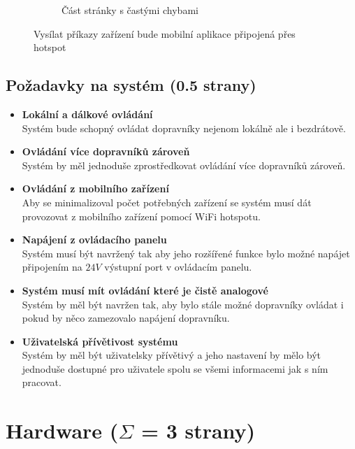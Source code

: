 \begin{figure}[H]
\begin{subfigure}[t]{0.3\textwidth}
        \caption{Část stránky s častými chybami}
        \label{fig:MobilniHelp}
    \end{subfigure}
    \caption{Vysílat příkazy zařízení bude mobilní aplikace připojená přes hotspot}
    \label{fig:MobilniAppScreenshots}
\end{figure}

\subsection{Požadavky na systém (0.5 strany)}\label{sec:PozadavkyNaSystem}
\begin{itemize}
    \item \textbf{Lokální a dálkové ovládání}\\
    Systém bude schopný ovládat dopravníky nejenom lokálně ale i bezdrátově.
    \item \textbf{Ovládání více dopravníků zároveň}\\
    Systém by měl jednoduše zprostředkovat ovládání více dopravníků zároveň.
    \item \textbf{Ovládání z mobilního zařízení}\\
    Aby se minimalizoval počet potřebných zařízení se systém musí dát provozovat z mobilního zařízení pomocí WiFi hotspotu.
    \item \textbf{Napájení z ovládacího panelu}\\
    Systém musí být navržený tak aby jeho rozšířené funkce bylo možné napájet připojením na $24V$ výstupní port v ovládacím panelu.
    \item \textbf{Systém musí mít ovládání které je čistě analogové}\\
    Systém by měl být navržen tak, aby bylo stále možné dopravníky ovládat i pokud by něco zamezovalo napájení dopravníku.
    \item \textbf{Uživatelská přívětivost systému}\\
    Systém by měl být uživatelsky přívětivý a jeho nastavení by mělo být jednoduše dostupné pro uživatele spolu se všemi informacemi jak s ním pracovat.
\end{itemize}

\section{Hardware ($\Sigma$ = 3 strany)}\label{sec:Hardware}

